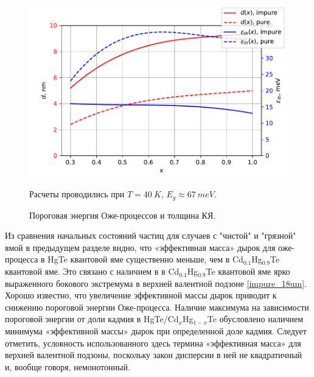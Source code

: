 \documentclass[../main.tex]{subfiles}
\begin{document}
    \begin{figure}[h]
    \vspace{0.75cm}
    \begin{minipage}[h]{\linewidth}
        \begin{center}
            \includegraphics[width=1\linewidth]{./images/de_vs_x.pdf}

            \vspace{0.75cm}
            \caption{Пороговая энергия Оже-процессов и толщина КЯ.}
            Расчеты проводились при $T= 40~K$, $E_g \approx 67~meV$.
            \vspace{1.25cm}
        \end{center}
    \end{minipage}
    \end{figure}

    Из сравнения начальных состояний частиц для случаев с "чистой" и "грязной" ямой в предыдущем разделе видно, 
    что «эффективная масса» дырок для оже-процесса в HgTe квантовой яме 
    существенно меньше, чем в Cd${}_{0.1}$Hg${}_{0.9}$Te квантовой яме. Это связано с наличием в в Cd${}_{0.1}$Hg${}_{0.9}$Te квантовой яме ярко выраженного бокового 
    экстремума в верхней валентной подзоне \ref{impure_18um}. Хорошо известно, что увеличение эффективной массы дырок приводит к снижению пороговой энергии 
    Оже-процесса. Наличие максимума на зависимости пороговой энергии от доли кадмия в HgTe/Cd${}_{x}$Hg${}_{1-x}$Te обусловлено наличием минимума 
    «эффективной массы» дырок при определенной доле кадмия. Следует отметить, условность использованного здесь термина «эффективная масса» 
    для верхней валентной подзоны, поскольку закон дисперсии в ней не квадратичный и, вообще говоря, немонотонный.
\end{document}
